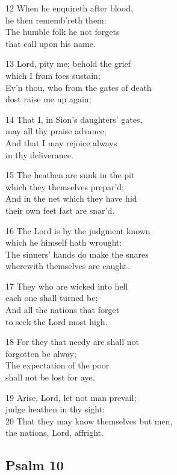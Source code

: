 12 When he enquireth after blood,\\
he then rememb’reth them:\\
The humble folk he not forgets\\
that call upon his name.

13 Lord, pity me; behold the grief\\
which I from foes sustain;\\
Ev’n thou, who from the gates of death\\
dost raise me up again;

14 That I, in Sion’s daughters’ gates,\\
may all thy praise advance;\\
And that I may rejoice always\\
in thy deliverance.

15 The heathen are sunk in the pit\\
which they themselves prepar’d;\\
And in the net which they have hid\\
their own feet fast are snar’d.

16 The Lord is by the judgment known\\
which he himself hath wrought:\\
The sinners’ hands do make the snares\\
wherewith themselves are caught.

17 They who are wicked into hell\\
each one shall turned be;\\
And all the nations that forget\\
to seek the Lord most high.

18 For they that needy are shall not\\
forgotten be alway;\\
The expectation of the poor\\
shall not be lost for aye.

19 Arise, Lord, let not man prevail;\\
judge heathen in thy sight:\\
20 That they may know themselves but men,\\
the nations, Lord, affright.

\begin{center}
\quad{}\quad{}
\end{center}

\subsection*{Psalm 10 }

